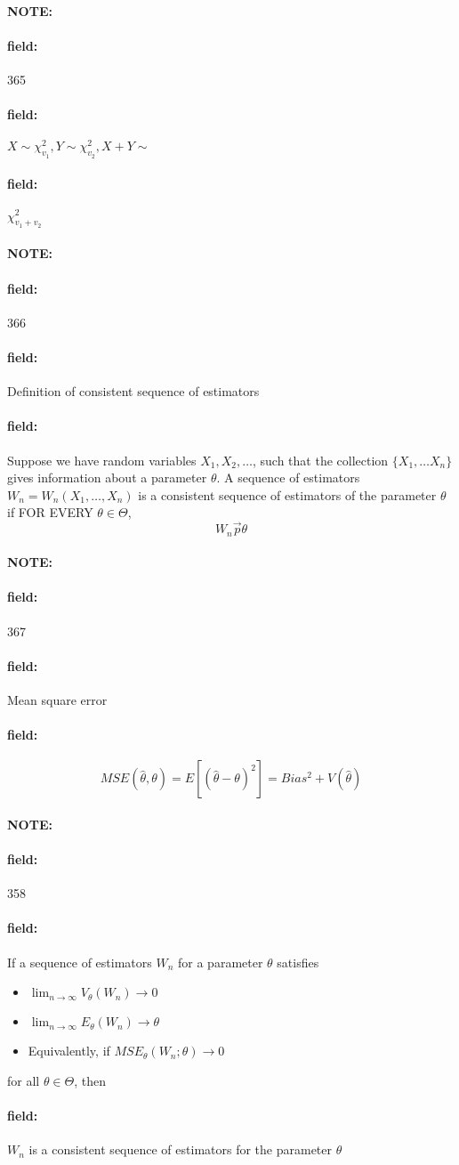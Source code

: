\documentclass[12pt]{article}
\newenvironment{note}{\paragraph{NOTE:}}{}
\newenvironment{field}{\paragraph{field:}}{}
\begin{document}
\begin{note}
    \begin{field}
        \tiny 365
    \end{field}
    \begin{field}
        $X \sim \chi^2_{v_1}, Y \sim \chi^2_{v_2}, X + Y \sim $
    \end{field}
    \begin{field}
        $\chi^2_{v_1 + v_2}$
    \end{field}
\end{note}


\begin{note}
    \begin{field}
        \tiny 366
    \end{field}
    \begin{field}
        Definition of consistent sequence of estimators
    \end{field}
    \begin{field}
        Suppose we have random variables $X_1, X_2, \ldots$, such that the collection $\{X_1, \ldots X_n\}$ gives information about a parameter $\theta$. A sequence of estimators $W_n = W_n(X_1, \ldots, X_n)$ is a consistent sequence of estimators of the parameter $\theta$ if FOR EVERY $\theta \in \Theta$,
        $$W_n \overset{\to}{p} \theta $$
    \end{field}
\end{note}

\begin{note}
    \begin{field}
        \tiny 367
    \end{field}
    \begin{field}
        Mean square error
    \end{field}
    \begin{field}
        $$MSE(\hat{\theta},\theta) = E[(\hat{\theta} - \theta)^2] = Bias^2 + V(\hat{\theta})$$
    \end{field}
\end{note}

\begin{note}
    \begin{field}
        \tiny 358
    \end{field}
    \begin{field}
        If a sequence of estimators $W_n$ for a parameter $\theta$ satisfies
        \begin{itemize}
          \item $\lim_{n\to\infty} V_\theta(W_n) \to 0$
          \item $\lim_{n\to\infty} E_{\theta}(W_n) \to \theta$
          \item Equivalently, if $MSE_\theta(W_n;\theta) \to 0$
        \end{itemize}
        for all $\theta \in \Theta$, then
    \end{field}
    \begin{field}
        $W_n$ is a consistent sequence of estimators for the parameter $\theta$
    \end{field}
\end{note}
\end{document}
